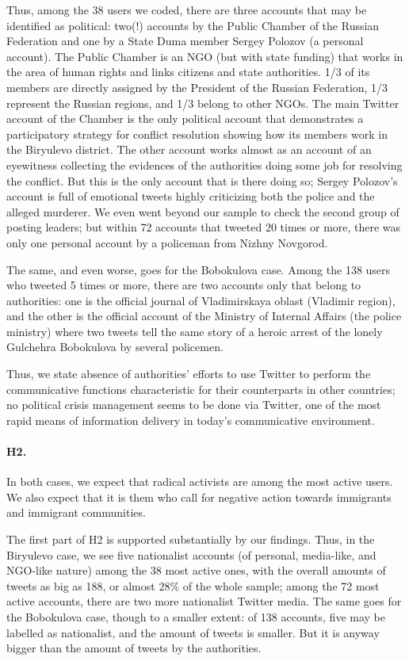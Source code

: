 Thus, among the 38 users we coded, there are three accounts that may be identified as political: two(!) accounts by the Public Chamber of the Russian Federation and one by a State Duma member Sergey Polozov (a personal account). The Public Chamber is an NGO (but with state funding) that works in the area of human rights and links citizens and state authorities. 1/3 of its members are directly assigned by the President of the Russian Federation, 1/3 represent the Russian regions, and 1/3 belong to other NGOs. The main Twitter account of the Chamber is the only political account that demonstrates a participatory strategy for conflict resolution showing how its members work in the Biryulevo district. The other account works almost as an account of an eyewitness collecting the evidences of the authorities doing some job for resolving the conflict. But this is the only account that is there doing so; Sergey Polozov’s account is full of emotional tweets highly criticizing both the police and the alleged murderer. We even went beyond our sample to check the second group of posting leaders; but within 72 accounts that tweeted 20 times or more, there was only one personal account by a policeman from Nizhny Novgorod.

The same, and even worse, goes for the Bobokulova case. Among the 138 users who tweeted 5 times or more, there are two accounts only that belong to authorities: one is the official journal of Vladimirskaya oblast (Vladimir region), and the other is the official account of the Ministry of Internal Affairs (the police ministry) where two tweets tell the same story of a heroic arrest of the lonely Gulchehra Bobokulova by several policemen.

Thus, we state absence of authorities’ efforts to use Twitter to perform the communicative functions characteristic for their counterparts in other countries; no political crisis management seems to be done via Twitter, one of the most rapid means of information delivery in today’s communicative environment.

\paragraph{H2.}  In both cases, we expect that radical activists are among the most active users. We also expect that it is them who call for negative action towards immigrants and immigrant communities.

The first part of H2 is supported substantially by our findings. Thus, in the Biryulevo case, we see five nationalist accounts (of personal, media-like, and NGO-like nature) among the 38 most active ones, with the overall amounts of tweets as big as 188, or almost 28\% of the whole sample; among the 72 most active accounts, there are two more nationalist Twitter media. The same goes for the Bobokulova case, though to a smaller extent: of 138 accounts, five may be labelled as nationalist, and the amount of tweets is smaller. But it is anyway bigger than the amount of tweets by the authorities.

